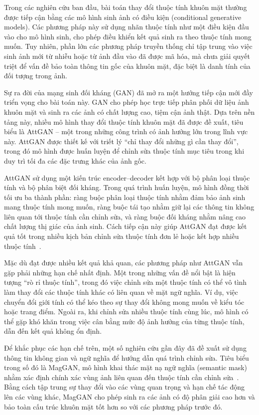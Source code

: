 \documentclass[../DoAn.tex]{subfiles}
\begin{document}
Trong các nghiên cứu ban đầu, bài toán thay đổi thuộc tính khuôn mặt thường được tiếp cận bằng các mô hình sinh ảnh có điều kiện (conditional generative models). Các phương pháp này sử dụng nhãn thuộc tính như một điều kiện đầu vào cho mô hình sinh, cho phép điều khiển kết quả sinh ra theo thuộc tính mong muốn. Tuy nhiên, phần lớn các phương pháp truyền thống chỉ tập trung vào việc sinh ảnh mới từ nhiễu hoặc từ ảnh đầu vào đã được mã hóa, mà chưa giải quyết triệt để vấn đề bảo toàn thông tin gốc của khuôn mặt, đặc biệt là danh tính của đối tượng trong ảnh.

Sự ra đời của mạng sinh đối kháng (GAN) đã mở ra một hướng tiếp cận mới đầy triển vọng cho bài toán này. GAN cho phép học trực tiếp phân phối dữ liệu ảnh khuôn mặt và sinh ra các ảnh có chất lượng cao, tiệm cận ảnh thật. Dựa trên nền tảng này, nhiều mô hình thay đổi thuộc tính khuôn mặt đã được đề xuất, tiêu biểu là AttGAN – một trong những công trình có ảnh hưởng lớn trong lĩnh vực này. AttGAN được thiết kế với triết lý “chỉ thay đổi những gì cần thay đổi”, trong đó mô hình được huấn luyện để chỉnh sửa thuộc tính mục tiêu trong khi duy trì tối đa các đặc trưng khác của ảnh gốc.

AttGAN sử dụng một kiến trúc encoder–decoder kết hợp với bộ phân loại thuộc tính và bộ phân biệt đối kháng. Trong quá trình huấn luyện, mô hình đồng thời tối ưu ba thành phần: ràng buộc phân loại thuộc tính nhằm đảm bảo ảnh sinh mang thuộc tính mong muốn, ràng buộc tái tạo nhằm giữ lại các thông tin không liên quan tới thuộc tính cần chỉnh sửa, và ràng buộc đối kháng nhằm nâng cao chất lượng thị giác của ảnh sinh. Cách tiếp cận này giúp AttGAN đạt được kết quả tốt trong nhiều kịch bản chỉnh sửa thuộc tính đơn lẻ hoặc kết hợp nhiều thuộc tính~\cite{he2017attgan}.

Mặc dù đạt được nhiều kết quả khả quan, các phương pháp như AttGAN vẫn gặp phải những hạn chế nhất định. Một trong những vấn đề nổi bật là hiện tượng “rò rỉ thuộc tính”, trong đó việc chỉnh sửa một thuộc tính có thể vô tình làm thay đổi các thuộc tính khác có liên quan về mặt ngữ nghĩa. Ví dụ, việc chuyển đổi giới tính có thể kéo theo sự thay đổi không mong muốn về kiểu tóc hoặc trang điểm. Ngoài ra, khi chỉnh sửa nhiều thuộc tính cùng lúc, mô hình có thể gặp khó khăn trong việc cân bằng mức độ ảnh hưởng của từng thuộc tính, dẫn đến kết quả không ổn định.

Để khắc phục các hạn chế trên, một số nghiên cứu gần đây đã đề xuất sử dụng thông tin không gian và ngữ nghĩa để hướng dẫn quá trình chỉnh sửa. Tiêu biểu trong số đó là MagGAN, mô hình khai thác mặt nạ ngữ nghĩa (semantic mask) nhằm xác định chính xác vùng ảnh liên quan đến thuộc tính cần chỉnh sửa~\cite{tang2019maggan}. Bằng cách tập trung sự thay đổi vào các vùng quan trọng và hạn chế tác động lên các vùng khác, MagGAN cho phép sinh ra các ảnh có độ phân giải cao hơn và bảo toàn cấu trúc khuôn mặt tốt hơn so với các phương pháp trước đó.
\end{document}
